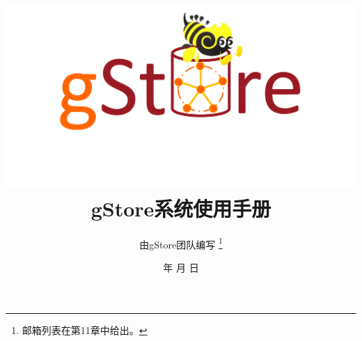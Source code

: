 \documentclass[titlepage, a4paper, 12pt]{article}
\begin{document}


\renewcommand{\contentsname}{目录}
\renewcommand{\listfigurename}{图目录}
\renewcommand{\listtablename}{表目录}
\renewcommand{\partname}{第\thepart部}
\renewcommand{\figurename}{图}
\renewcommand{\tablename}{表}
\renewcommand{\appendixname}{附录}
\renewcommand{\indexname}{索引}
\renewcommand{\abstractname}{摘要}
\renewcommand{\refname}{参考文献}
\renewcommand{\equationautorefname}{公式}
\renewcommand{\footnoteautorefname}{脚注}
\renewcommand{\itemautorefname}{项}
\renewcommand{\figureautorefname}{图}
\renewcommand{\tableautorefname}{表}
\renewcommand{\theoremautorefname}{定理}
\renewcommand{\today}{\number\year 年 \number\month 月 \number\day 日}	


\title{\includegraphics[scale=0.3, bb=0 0 385 567]{logo.png} \\
	gStore系统使用手册}
\author{由gStore团队编写 \footnote{邮箱列表在第11章中给出。}}
\date{\today}
\maketitle
\end{document}
